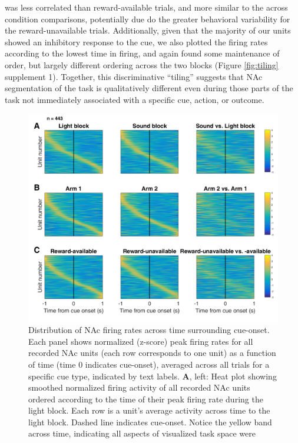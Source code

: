 \documentclass[11pt]{article}
\newcommand{\bsf}[1]{\textbf{#1}}
\providecommand{\DIFadd}[1]{{\protect\color{red} \sf #1}} %
\providecommand{\DIFaddbegin}{} %
\providecommand{\DIFaddend}{} %
\newcommand{\DIFaddincludegraphics}[2][]{{\color{red}\fbox{\DIFOincludegraphics[#1]{#2}}}} %
\DeclareRobustCommand{\DIFaddbegin}{\DIFOaddbegin \let\includegraphics\DIFaddincludegraphics} %
\DeclareRobustCommand{\DIFaddend}{\DIFOaddend \let\includegraphics\DIFOincludegraphics} %
\begin{document}
was less correlated than reward-available trials, and more similar to
the across condition comparisons, potentially due do the greater
behavioral variability for the reward-unavailable trials. \DIFaddbegin \DIFadd{Additionally, given that the majority of our units showed an inhibitory response to the cue, we
also plotted the firing rates according to the lowest time in firing,
and again found some maintenance of order, but largely different
ordering across the two blocks (Figure \ref{fig:tiling} supplement 1). Together, this discriminative ``tiling'' suggests that NAc segmentation of the task is
qualitatively different even during those parts of the task not
immediately associated with a specific cue, action, or outcome.
}\DIFaddend 

 \begin{figure}[ht!]
\centering
\includegraphics[width=\textwidth]{Fig 6 - Task tiling.pdf}
\caption{Distribution of NAc firing rates across time surrounding cue-onset. Each panel shows normalized (z-score) peak firing rates for all recorded NAc
units (each row corresponds to one unit) as a function of time (time 0
indicates cue-onset), averaged across all trials for a specific cue type,
indicated by text labels. \bsf{A}, left: Heat plot showing smoothed normalized firing
activity of all recorded NAc units ordered according to the time of their peak
firing rate during the light block. Each row is a unit’s average activity
across time to the light block. Dashed line indicates cue-onset. Notice the
yellow band across time, indicating all aspects of visualized task space were
}
\end{figure}
\end{document}
